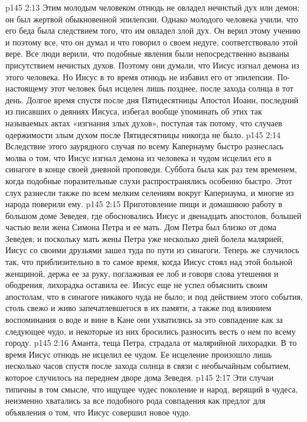 \vs p145 2:13 Этим молодым человеком отнюдь не овладел нечистый дух или демон; он был жертвой обыкновенной эпилепсии. Однако молодого человека учили, что его беда была следствием того, что им овладел злой дух. Он верил этому учению и поэтому все, что он думал и что говорил о своем недуге, соответствовало этой вере. Все люди верили, что подобные явления были непосредственно вызваны присутствием нечистых духов. Поэтому они думали, что Иисус изгнал демона из этого человека. Но Иисус в то время отнюдь не избавил его от эпилепсии. По\hyp{}настоящему этот человек был исцелен лишь позднее, после захода солнца в тот день. Долгое время спустя после дня Пятидесятницы Апостол Иоанн, последний из писавших о деяниях Иисуса, избегал вообще упоминать об этих так называемых актах «изгнания злых духов», поступая так потому, что случаев одержимости злым духом после Пятидесятницы никогда не было.
\vs p145 2:14 Вследствие этого заурядного случая по всему Капернауму быстро разнеслась молва о том, что Иисус изгнал демона из человека и чудом исцелил его в синагоге в конце своей дневной проповеди. Суббота была как раз тем временем, когда подобные поразительные слухи распространялись особенно быстро. Этот слух разнесли также по всем мелким селениям вокруг Капернаума, и многие из народа поверили ему.
\vs p145 2:15 \pc Приготовление пищи и домашнюю работу в большом доме Зеведея, где обосновались Иисус и двенадцать апостолов, большей частью вели жена Симона Петра и ее мать. Дом Петра был близко от дома Зеведея; и поскольку мать жены Петра уже несколько дней болела малярией, Иисус со своими друзьями зашел туда по пути из синагоги. Теперь же случилось так, что приблизительно в то самое время, когда Иисус стоял над этой больной женщиной, держа ее за руку, поглаживая ее лоб и говоря слова утешения и ободрения, лихорадка оставила ее. Иисус еще не успел объяснить своим апостолам, что в синагоге никакого чуда не было; и под действием этого события, столь свежо и живо запечатлевшегося в их памяти, а также под влиянием воспоминания о воде и вине в Кане они ухватились за это совпадение как за следующее чудо, и некоторые из них бросились разносить весть о нем по всему городу.
\vs p145 2:16 Аманта, теща Петра, страдала от малярийной лихорадки. В то время Иисус отнюдь не исцелил ее чудом. Ее исцеление произошло лишь несколько часов спустя после захода солнца в связи с необычайным событием, которое случилось на переднем дворе дома Зеведея.
\vs p145 2:17 \pc Эти случаи типичны в том смысле, что ищущее чудес поколение и народ, верящий в чудеса, неизменно хватались за все подобного рода совпадения как предлог для объявления о том, что Иисус совершил новое чудо.
